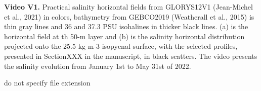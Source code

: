 \documentclass[draft,jgrga]{agutexSI2019}
\begin{document}
\begin{article}
\newpage
\noindent\textbf{Video V1.} Practical salinity horizontal fields from GLORYS12V1 (Jean-Michel et al., 2021) in colors, bathymetry from GEBCO2019 (Weatherall et al., 2015) is thin gray lines and 36 and 37.3 PSU isohalines in thicker black lines. (a) is the horizontal field at th 50-m layer and (b) is the salinity horizontal distribution projected onto the 25.5 kg m-3 isopycnal surface, with the selected profiles, presented in SectionXXX in the manuscript, in black scatters. The video presents the salinity evolution from January 1st to May 31st of 2022.

%
%



% 
%
 do not specify file extension
%
%
%

%  




%
%
%
%
%

%
%
\end{article}
\end{document}
